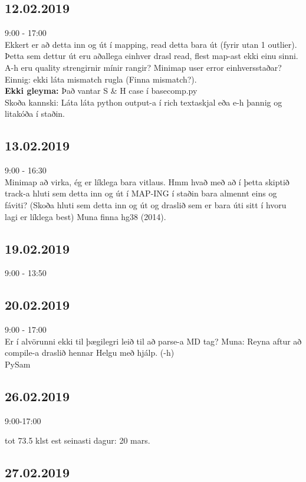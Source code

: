 \documentclass{article}
\begin{document}
\subsection*{12.02.2019}
9:00 - 17:00 \\
Ekkert er að detta inn og út í mapping, read detta bara út (fyrir utan 1 outlier). Þetta sem dettur út eru aðallega einhver drasl read, flest map-ast ekki einu sinni. \\
A-h eru quality strengirnir mínir rangir? Minimap user error einhversstaðar? Einnig: ekki láta mismatch rugla (Finna mismatch?).\\
\textbf{Ekki gleyma: } 
Það vantar S \& H case í basecomp.py \\
Skoða kannski: Láta láta python output-a í rich textaskjal eða e-h þannig og litakóða í staðin.\\

\subsection*{13.02.2019}
9:00 - 16:30\\
Minimap að virka, ég er líklega bara vitlaus. 	
Hmm hvað með að í þetta skiptið track-a hluti sem detta inn og út í MAP-ING í staðin bara almennt eins og fáviti? (Skoða hluti sem detta inn og út og draslið sem er bara úti sitt í hvoru lagi er líklega best)
Muna finna hg38 (2014).


\subsection*{19.02.2019}
9:00 - 13:50 \\

\subsection*{20.02.2019}
9:00 - 17:00\\
Er í alvörunni ekki til þægilegri leið til að parse-a MD tag?
Muna: Reyna aftur að compile-a draslið hennar Helgu með hjálp. (-h) \\
PySam


\subsection*{26.02.2019}
9:00-17:00

tot 73.5 klst
est seinasti dagur: 20 mars.
\subsection{27.02.2019}
\end{document}
